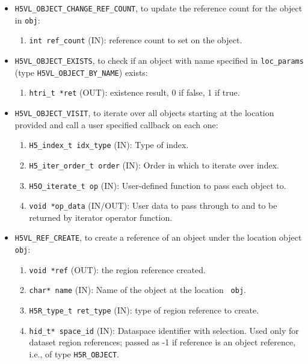 \begin{itemize}
\item {\tt H5VL\_OBJECT\_CHANGE\_REF\_COUNT}, to update the reference
  count for the object in {\tt obj}:
  \begin{enumerate}
  \item {\tt int ref\_count} (IN): reference count to set on the object.
  \end{enumerate}

\item {\tt H5VL\_OBJECT\_EXISTS}, to check if an object with name
  specified in {\tt loc\_params} (type {\tt H5VL\_OBJECT\_BY\_NAME})
  exists:
  \begin{enumerate}
  \item {\tt htri\_t *ret} (OUT): existence result, 0 if false, 1 if true.
  \end{enumerate}

\item {\tt H5VL\_OBJECT\_VISIT}, to iterate over all objects starting at the location provided and call a user specified callback on each one:
  \begin{enumerate}
  \item {\tt H5\_index\_t idx\_type} (IN): Type of index.\\
  \item {\tt H5\_iter\_order\_t order} (IN): Order in which to iterate over index.\\
  \item {\tt H5O\_iterate\_t op} (IN): User-defined function to pass each object to. \\
  \item {\tt void *op\_data} (IN/OUT): User data to pass through to and to be returned by iterator operator function. \\
  \end{enumerate}
  
\item {\tt H5VL\_REF\_CREATE}, to create a reference of an object
  under the location object {\tt obj}:
  \begin{enumerate}
  \item {\tt void *ref} (OUT): the region reference created.
  \item {\tt char* name} (IN): Name of the object at the location {\tt
      obj}.
  \item {\tt H5R\_type\_t ret\_type} (IN): type of region reference to
    create.
  \item {\tt hid\_t* space\_id} (IN): Dataspace identifier with
    selection. Used only for dataset region references; passed as -1 if
    reference is an object reference, i.e., of type {\tt H5R\_OBJECT}.
  \end{enumerate}
\end{itemize}

